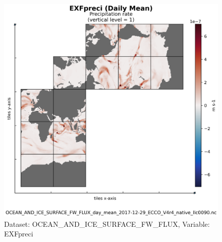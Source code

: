 \begin{figure}[H]
\centering
\includegraphics[scale=0.55]{../images/plots/native_plots/Ocean_and_Sea-Ice_Surface_Freshwater_Fluxes/EXFpreci.png}
\caption{Dataset: OCEAN\_AND\_ICE\_SURFACE\_FW\_FLUX, Variable: EXFpreci}
\label{tab:table-OCEAN_AND_ICE_SURFACE_FW_FLUX_EXFpreci-Plot}
\end{figure}
\newpage
\pagebreak

